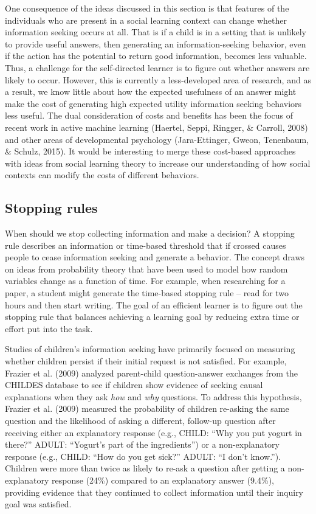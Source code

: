 \documentclass[english,floatsintext,man]{apa6}
\theoremstyle{definition}
\theoremstyle{definition}
\theoremstyle{definition}
\theoremstyle{remark}
\begin{document}
One consequence of the ideas discussed in this section is that features
of the individuals who are present in a social learning context can
change whether information seeking occurs at all. That is if a child is
in a setting that is unlikely to provide useful answers, then generating
an information-seeking behavior, even if the action has the potential to
return good information, becomes less valuable. Thus, a challenge for
the self-directed learner is to figure out whether answers are likely to
occur. However, this is currently a less-developed area of research, and
as a result, we know little about how the expected usefulness of an
answer might make the cost of generating high expected utility
information seeking behaviors less useful. The dual consideration of
costs and benefits has been the focus of recent work in active machine
learning (Haertel, Seppi, Ringger, \& Carroll, 2008) and other areas of
developmental psychology (Jara-Ettinger, Gweon, Tenenbaum, \& Schulz,
2015). It would be interesting to merge these cost-based approaches with
ideas from social learning theory to increase our understanding of how
social contexts can modify the costs of different behaviors.

\subsection{Stopping rules}\label{stopping-rules}

When should we stop collecting information and make a decision? A
stopping rule describes an information or time-based threshold that if
crossed causes people to cease information seeking and generate a
behavior. The concept draws on ideas from probability theory that have
been used to model how random variables change as a function of time.
For example, when researching for a paper, a student might generate the
time-based stopping rule -- read for two hours and then start writing.
The goal of an efficient learner is to figure out the stopping rule that
balances achieving a learning goal by reducing extra time or effort put
into the task.

Studies of children's information seeking have primarily focused on
measuring whether children persist if their initial request is not
satisfied. For example, Frazier et al. (2009) analyzed parent-child
question-answer exchanges from the CHILDES database to see if children
show evidence of seeking causal explanations when they ask \emph{how}
and \emph{why} questions. To address this hypothesis, Frazier et al.
(2009) measured the probability of children re-asking the same question
and the likelihood of asking a different, follow-up question after
receiving either an explanatory response (e.g., CHILD: \enquote{Why you
put yogurt in there?} ADULT: \enquote{Yogurt's part of the ingredients})
or a non-explanatory response (e.g., CHILD: \enquote{How do you get
sick?} ADULT: \enquote{I don't know.}). Children were more than twice as
likely to re-ask a question after getting a non-explanatory response
(24\%) compared to an explanatory answer (9.4\%), providing evidence
that they continued to collect information until their inquiry goal was
satisfied.
\end{document}
